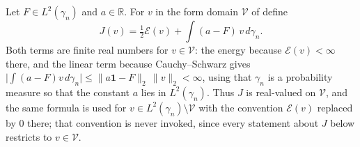 \begin{definition}
Let $F \in L^2(\gamma_n)$ and $a \in \mathbb{R}$.  For $v$ in the form domain
$\mathcal{V}$ of  define
\[
  J(v) = \tfrac12 \mathcal{E}(v) + \int (a - F)\, v \, d\gamma_n .
\]
Both terms are finite real numbers for $v \in \mathcal{V}$: the energy because
$\mathcal{E}(v) < \infty$ there, and the linear term because Cauchy--Schwarz gives
$\bigl|\int(a-F)v\,d\gamma_n\bigr| \leq \|a\mathbf{1} - F\|_2\,\|v\|_2 < \infty$,
using that $\gamma_n$ is a probability measure so that the constant $a$ lies in
$L^2(\gamma_n)$.  Thus $J$ is real-valued on $\mathcal{V}$, and the same formula
is used for $v \in L^2(\gamma_n)\setminus\mathcal{V}$ with the convention
$\mathcal{E}(v)$ replaced by $0$ there; that convention is never invoked, since
every statement about $J$ below restricts to $v \in \mathcal{V}$.
\end{definition}

